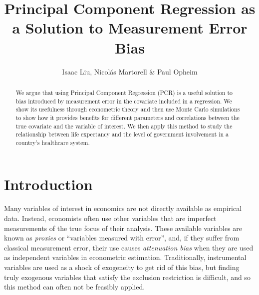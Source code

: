 \documentclass[12pt]{article}
\begin{document}
    \thispagestyle{firststyle}

    \author{Isaac Liu, Nicol\'as Martorell \& Paul Opheim}
    \title{Principal Component Regression as a Solution to Measurement Error Bias} 
    \maketitle



    \begin{abstract}

        We argue that using Principal Component Regression (PCR) is a useful solution to bias introduced by measurement error in the covariate included in a regression. We show its usefulness through econometric theory and then use Monte Carlo simulations to show how it provides benefits for different parameters and correlations between the true covariate and the variable of interest. We then apply this method to study the relationship between life expectancy and the level of government involvement in a country's healthcare system.
        
    \end{abstract}

    \newpage \clearpage

\section*{Introduction}
        Many variables of interest in economics are not directly available as empirical data. Instead, economists often use other variables that are imperfect measurements of the true focus of their analysis. These available variables are known as \textit{proxies} or ``variables measured with error'', and, if they suffer from classical measurement error, their use causes \textit{attenuation bias} when they are used as independent variables in econometric estimation. Traditionally, instrumental variables are used as a shock of exogeneity to get rid of this bias, but finding truly exogenous variables that satisfy the exclusion restriction is difficult, and so this method can often not be feasibly applied.
\end{document}
